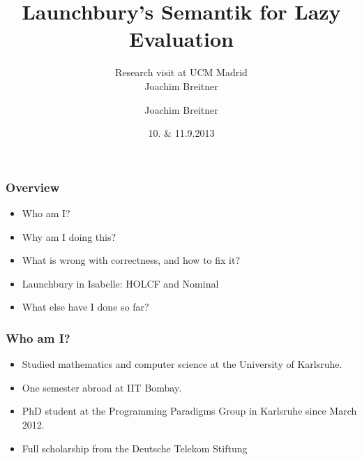 \documentclass{beamer}
\title{Launchbury's Semantik for Lazy Evaluation}
\subtitle{Research visit at UCM Madrid\\
Joachim Breitner}
\author{Joachim Breitner}
\date{10. \& 11.9.2013}
\institute{LEHRSTUHL PROGRAMMIERPARADIGMEN}%
\institute{PROGRAMMING PARADIGMS GROUP}%
\begin{document}
\maketitle

\begin{frame}
\frametitle{Overview}

\begin{itemize}
\item Who am I?
\item Why am I doing this?
\item What is wrong with correctness, and how to fix it?
\item Launchbury in Isabelle: HOLCF and Nominal
\item What else have I done so far?
\end{itemize}

\end{frame}


\begin{frame}
\frametitle{Who am I?}

\begin{itemize}
\item Studied mathematics and computer science at the University of Karlsruhe.
\item One semester abroad at IIT Bombay.
\item PhD student at the Programming Paradigms Group in Karlsruhe since March 2012.
\item Full scholarship from the Deutsche Telekom Stiftung
\end{itemize}

\end{frame}

\newcommand{\sVar}{\text{Var}}
\newcommand{\sExp}{\text{Exp}}
\newcommand{\sHeap}{\text{Heap}}
\newcommand{\sVal}{\text{Val}}
\newcommand{\sValue}{\text{Value}}
\newcommand{\sEnv}{\text{Env}}
\newcommand{\sApp}[2]{\operatorname{#1}#2}
\newcommand{\sLam}[2]{\text{\textlambda} #1.\, #2}
\newcommand{\sLet}[2]{\text{\textsf{let}}\ #1\ \text{\textsf{in}}\ #2}
\newcommand{\sred}[4]{#1 : #2 \Downarrow #3 : #4}
\newcommand{\sRule}[1]{\text{{\textsc{#1}}}}
\newcommand{\sDeepDup}[1]{\sApp \mdeepDup #1}
\newcommand{\mdeepDup}{\text{\textsf{deepDup}}}
\newcommand{\fv}[1]{\text{fv}(#1)}
\newcommand{\dom}[1]{\text{dom}\,#1}
\newcommand{\fresh}[1]{#1'}
\end{document}
